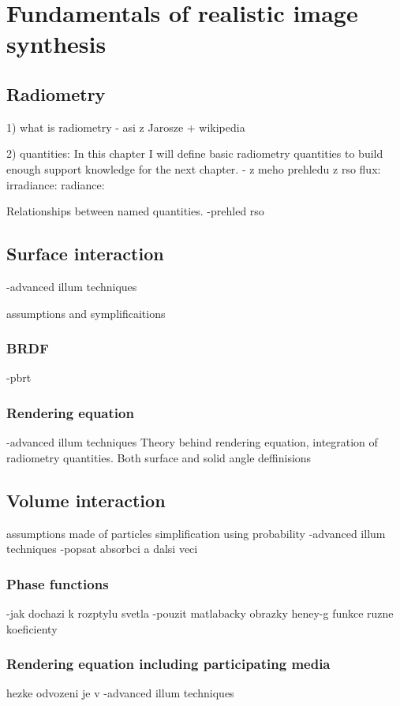 \chapter{Fundamentals of realistic image synthesis}

\section{Radiometry}
1) what is radiometry
- asi z Jarosze + wikipedia

2) quantities:
In this chapter I will define basic radiometry quantities to build enough support knowledge for the next chapter. 
- z meho prehledu z rso
flux: 
irradiance:
radiance:

Relationships between named quantities.
-prehled rso

\section{Surface interaction}
-advanced illum techniques

assumptions and symplificaitions 
\subsection{BRDF}
-pbrt
\subsection{Rendering equation}
-advanced illum techniques
Theory behind rendering equation, integration of radiometry quantities. Both surface and solid angle deffinisions

\section{Volume interaction}
assumptions made of particles simplification using probability
-advanced illum techniques
-popsat absorbci a dalsi veci
\subsection{Phase functions}
-jak dochazi k rozptylu svetla
-pouzit matlabacky obrazky heney-g funkce ruzne koeficienty

\subsection{Rendering equation including participating media}
hezke odvozeni je v -advanced illum techniques

